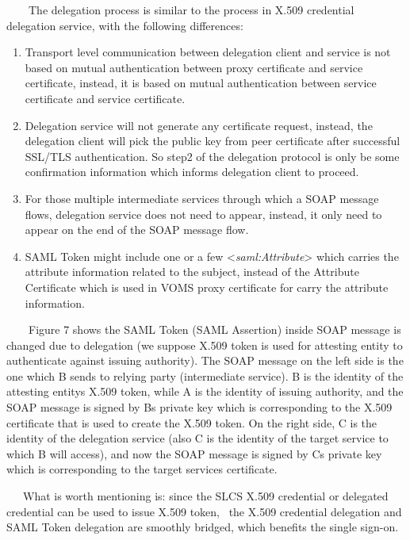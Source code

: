 \documentclass{article}
\newcommand\liststyleLvi{%
\renewcommand\theenumi{\arabic{enumi}}
\renewcommand\theenumii{\arabic{enumii}}
\renewcommand\theenumiii{\arabic{enumiii}}
\renewcommand\theenumiv{\arabic{enumiv}}
\renewcommand\labelenumi{\theenumi.}
\renewcommand\labelenumii{\theenumii.}
\renewcommand\labelenumiii{\theenumiii.}
\renewcommand\labelenumiv{\theenumiv.}
}
\begin{document}
\ \ \ \ The delegation process is similar to the process in X.509
credential delegation service, with the following differences:

\liststyleLvi
\begin{enumerate}
\item Transport level communication between delegation client and
service is not based on mutual authentication between proxy certificate
and service certificate, instead, it is based on mutual authentication
between service certificate and service certificate.
\item Delegation service will not generate any certificate request,
instead, the delegation client will pick the public key from peer
certificate after successful SSL/TLS authentication. So step2 of the
delegation protocol is only be some confirmation information which
informs delegation client to proceed. 
\item For those multiple intermediate services through which a SOAP
message flows, delegation service does not need to appear, instead, it
only need to appear on the end of the SOAP message flow.
\item SAML Token might include one or a few
{\textless}\textit{saml:Attribute}{\textgreater} which carries the
attribute information related to the subject, instead of the Attribute
Certificate which is used in VOMS proxy certificate for carry the
attribute information.
\end{enumerate}
\ \ \ \ Figure 7 shows the SAML Token (SAML Assertion) inside SOAP
message is changed due to delegation (we suppose X.509 token is used
for attesting entity to authenticate against issuing authority). The
SOAP message on the left side is the one which B sends to relying party
(intermediate service). B is the identity of the attesting
entity{\textquotesingle}s X.509 token, while A is the identity of
issuing authority, and the SOAP message is signed by
B{\textquotesingle}s private key which is corresponding to the X.509
certificate that is used to create the X.509 token. On the right side,
C is the identity of the delegation service (also C is the identity of
the target service to which B will access), and now the SOAP message is
signed by C{\textquotesingle}s private key which is corresponding to
the target service{\textquotesingle}s certificate.

\ \ \ What is worth mentioning is: since the SLCS X.509 credential or
delegated credential can be used to issue X.509 token, \ the X.509
credential delegation and SAML Token delegation are smoothly bridged,
which benefits the single sign-on. 
\end{document}
